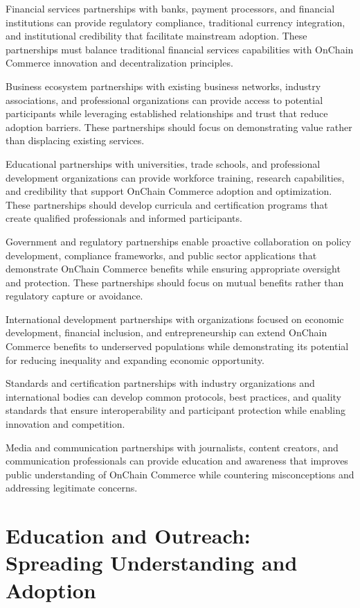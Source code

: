 \documentclass[
  Letterpaper,
]{scrbook}
\begin{document}
Financial services partnerships with banks, payment processors, and
financial institutions can provide regulatory compliance, traditional
currency integration, and institutional credibility that facilitate
mainstream adoption. These partnerships must balance traditional
financial services capabilities with OnChain Commerce innovation and
decentralization principles.

Business ecosystem partnerships with existing business networks,
industry associations, and professional organizations can provide access
to potential participants while leveraging established relationships and
trust that reduce adoption barriers. These partnerships should focus on
demonstrating value rather than displacing existing services.

Educational partnerships with universities, trade schools, and
professional development organizations can provide workforce training,
research capabilities, and credibility that support OnChain Commerce
adoption and optimization. These partnerships should develop curricula
and certification programs that create qualified professionals and
informed participants.

Government and regulatory partnerships enable proactive collaboration on
policy development, compliance frameworks, and public sector
applications that demonstrate OnChain Commerce benefits while ensuring
appropriate oversight and protection. These partnerships should focus on
mutual benefits rather than regulatory capture or avoidance.

International development partnerships with organizations focused on
economic development, financial inclusion, and entrepreneurship can
extend OnChain Commerce benefits to underserved populations while
demonstrating its potential for reducing inequality and expanding
economic opportunity.

Standards and certification partnerships with industry organizations and
international bodies can develop common protocols, best practices, and
quality standards that ensure interoperability and participant
protection while enabling innovation and competition.

Media and communication partnerships with journalists, content creators,
and communication professionals can provide education and awareness that
improves public understanding of OnChain Commerce while countering
misconceptions and addressing legitimate concerns.

\section{Education and Outreach: Spreading Understanding and
Adoption}\label{education-and-outreach-spreading-understanding-and-adoption}
\end{document}
